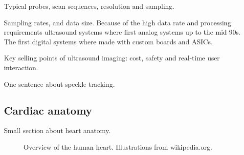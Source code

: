 Typical probes, scan sequences, resolution and sampling.

Sampling rates, and data size.
Because of the high data rate and processing requirements ultrasound systems where first analog systems up to the mid 90s. The first digital systems where made with custom boards and ASICs.

Key selling points of ultrasound imaging: cost, safety and real-time user interaction.

One sentence about speckle tracking.

\subsection{Cardiac anatomy}
Small section about heart anatomy.

\begin{figure}
\centering
{}
\caption{Overview of the human heart. Illustrations from wikipedia.org.}
\label{fig:human_heart}
\end{figure}
							
